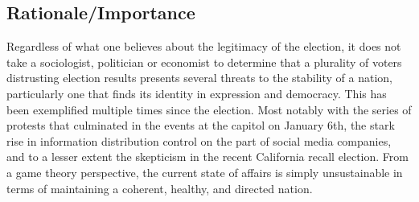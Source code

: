 \documentclass{article}
\begin{document}
\subsection{Rationale/Importance}
\smallbreak \noindent
Regardless of what one believes about the legitimacy of the election, it does not take a sociologist, politician or economist to determine that a plurality of voters distrusting election results presents several threats to the stability of a nation, particularly one that finds its identity in expression and democracy. This has been exemplified multiple times since the election. Most notably with the series of protests that culminated in the events at the capitol on January 6th, the stark rise in information distribution control on the part of social media companies, and to a lesser extent the skepticism in the recent California recall election. From a game theory perspective, the current state of affairs is simply unsustainable in terms of maintaining a coherent, healthy, and directed nation.
\end{document}
